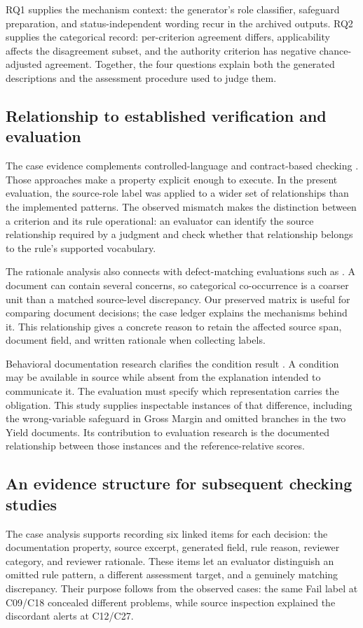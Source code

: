 \documentclass[a4paper,fleqn]{cas-dc}
\begin{document}
RQ1 supplies the mechanism context: the generator's role classifier, safeguard preparation, and status-independent wording recur in the archived outputs. RQ2 supplies the categorical record: per-criterion agreement differs, applicability affects the disagreement subset, and the authority criterion has negative chance-adjusted agreement. Together, the four questions explain both the generated descriptions and the assessment procedure used to judge them.

\subsection{Relationship to established verification and evaluation}
The case evidence complements controlled-language and contract-based checking \citep{KuhnBergel2014,Lozano2015}. Those approaches make a property explicit enough to execute. In the present evaluation, the source-role label was applied to a wider set of relationships than the implemented patterns. The observed mismatch makes the distinction between a criterion and its rule operational: an evaluator can identify the source relationship required by a judgment and check whether that relationship belongs to the rule's supported vocabulary.

The rationale analysis also connects with defect-matching evaluations such as \citet{HabibPradel2018}. A document can contain several concerns, so categorical co-occurrence is a coarser unit than a matched source-level discrepancy. Our preserved matrix is useful for comparing document decisions; the case ledger explains the mechanisms behind it. This relationship gives a concrete reason to retain the affected source span, document field, and written rationale when collecting labels.

Behavioral documentation research clarifies the condition result \citep{Zhou2017,Yang2026OCL2NL,Eghbali2026}. A condition may be available in source while absent from the explanation intended to communicate it. The evaluation must specify which representation carries the obligation. This study supplies inspectable instances of that difference, including the wrong-variable safeguard in Gross Margin and omitted branches in the two Yield documents. Its contribution to evaluation research is the documented relationship between those instances and the reference-relative scores.

\subsection{An evidence structure for subsequent checking studies}
The case analysis supports recording six linked items for each decision: the documentation property, source excerpt, generated field, rule reason, reviewer category, and reviewer rationale. These items let an evaluator distinguish an omitted rule pattern, a different assessment target, and a genuinely matching discrepancy. Their purpose follows from the observed cases: the same Fail label at C09/C18 concealed different problems, while source inspection explained the discordant alerts at C12/C27.
\end{document}
